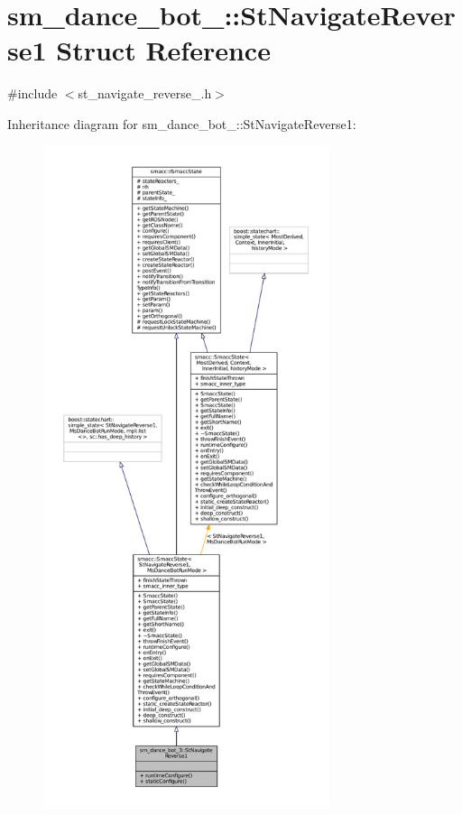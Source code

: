 \hypertarget{structsm__dance__bot__3_1_1StNavigateReverse1}{}\section{sm\+\_\+dance\+\_\+bot\+\_\+:\+:St\+Navigate\+Reverse1 Struct Reference}
\label{structsm__dance__bot__3_1_1StNavigateReverse1}


{\ttfamily \#include $<$st\+\_\+navigate\+\_\+reverse\+\_.\+h$>$}



Inheritance diagram for sm\+\_\+dance\+\_\+bot\+\_\+:\+:St\+Navigate\+Reverse1\+:
\nopagebreak
\begin{figure}[H]
\begin{center}
\leavevmode
\includegraphics[height=550pt]{structsm__dance__bot__3_1_1StNavigateReverse1__inherit__graph}
\end{center}
\end{figure}


